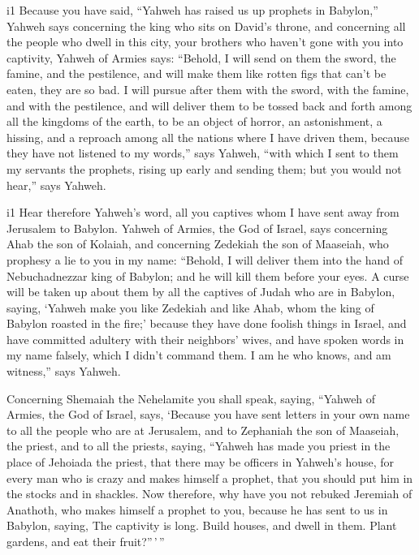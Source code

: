 i1 Because you have said, ``Yahweh has raised us up
prophets in Babylon,''  Yahweh says concerning the king
who sits on David's throne, and concerning all the people who dwell in
this city, your brothers who haven't gone with you into captivity,
 Yahweh of Armies says: ``Behold, I will send on them the
sword, the famine, and the pestilence, and will make them like rotten
figs that can't be eaten, they are so bad.  I will pursue
after them with the sword, with the famine, and with the pestilence, and
will deliver them to be tossed back and forth among all the kingdoms of
the earth, to be an object of horror, an astonishment, a hissing, and a
reproach among all the nations where I have driven them, 
because they have not listened to my words,'' says Yahweh, ``with which
I sent to them my servants the prophets, rising up early and sending
them; but you would not hear,'' says Yahweh.

i1 Hear therefore Yahweh's word, all you captives whom I
have sent away from Jerusalem to Babylon.  Yahweh of
Armies, the God of Israel, says concerning Ahab the son of Kolaiah, and
concerning Zedekiah the son of Maaseiah, who prophesy a lie to you in my
name: ``Behold, I will deliver them into the hand of Nebuchadnezzar king
of Babylon; and he will kill them before your eyes.  A
curse will be taken up about them by all the captives of Judah who are
in Babylon, saying, `Yahweh make you like Zedekiah and like Ahab, whom
the king of Babylon roasted in the fire;'  because they
have done foolish things in Israel, and have committed adultery with
their neighbors' wives, and have spoken words in my name falsely, which
I didn't command them. I am he who knows, and am witness,'' says Yahweh.

 Concerning Shemaiah the Nehelamite you shall speak,
saying,  ``Yahweh of Armies, the God of Israel, says,
`Because you have sent letters in your own name to all the people who
are at Jerusalem, and to Zephaniah the son of Maaseiah, the priest, and
to all the priests, saying,  ``Yahweh has made you priest
in the place of Jehoiada the priest, that there may be officers in
Yahweh's house, for every man who is crazy and makes himself a prophet,
that you should put him in the stocks and in shackles. 
Now therefore, why have you not rebuked Jeremiah of Anathoth, who makes
himself a prophet to you,  because he has sent to us in
Babylon, saying, The captivity is long. Build houses, and dwell in them.
Plant gardens, and eat their fruit?''\,'\,''

